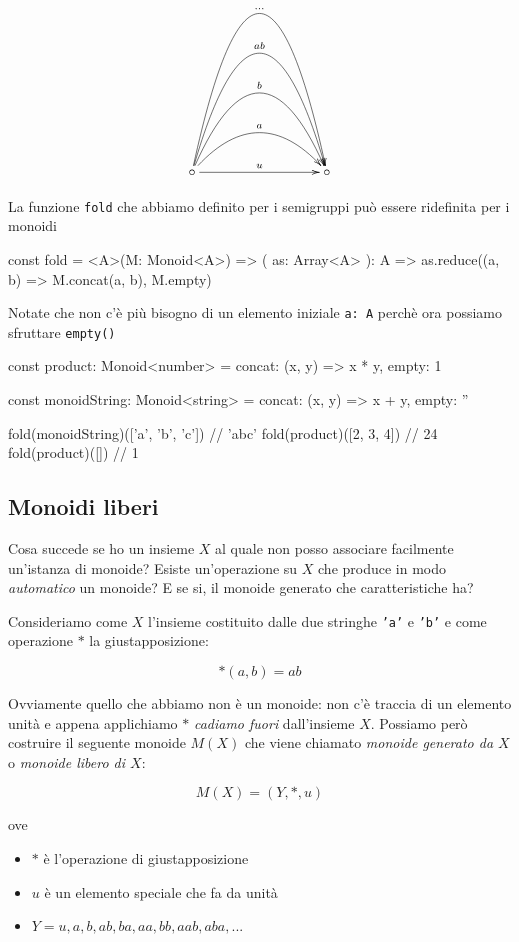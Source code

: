 \documentclass[12pt]{article}
\theoremstyle{definition}
\newenvironment{code}
  {\vspace{0.5cm} \VerbatimEnvironment\begin{typescriptcode}}
  {\end{typescriptcode} \vspace{0.2cm}}
\begin{document}
\[
\xymatrixrowsep{3cm}
\xymatrixcolsep{3cm}
\xymatrix{
  \circ \ar[r]^u \ar@/^1cm/[r]^a \ar@/^2cm/[r]^b \ar@/^3cm/[r]^{ab} \ar@/^4cm/[r]^{\ldots} & \circ
}
\]

La funzione \texttt{fold} che abbiamo definito per i semigruppi può essere ridefinita per i monoidi

\begin{code}
const fold = <A>(M: Monoid<A>) => (
  as: Array<A>
): A => as.reduce((a, b) => M.concat(a, b), M.empty)
\end{code}

Notate che non c'è più bisogno di un elemento iniziale \texttt{a: A} perchè ora possiamo sfruttare \texttt{empty()}

\begin{code}
const product: Monoid<number> = {
  concat: (x, y) => x * y,
  empty: 1
}

const monoidString: Monoid<string> = {
  concat: (x, y) => x + y,
  empty: ''
}

fold(monoidString)(['a', 'b', 'c']) // 'abc'
fold(product)([2, 3, 4]) // 24
fold(product)([]) // 1
\end{code}

\subsection{Monoidi liberi}

Cosa succede se ho un insieme $X$ al quale non posso associare facilmente un'istanza di monoide?
Esiste un'operazione su $X$ che produce in modo \emph{automatico} un monoide?
E se si, il monoide generato che caratteristiche ha?

Consideriamo come $X$ l'insieme costituito dalle due stringhe \texttt{'a'} e \texttt{'b'} e come operazione $*$ la giustapposizione:

$$
*(a, b) = ab
$$

Ovviamente quello che abbiamo non è un monoide: non c'è traccia di un elemento unità e appena applichiamo $*$ \emph{cadiamo fuori}
dall'insieme $X$. Possiamo però costruire il seguente monoide $M(X)$ che viene chiamato \emph{monoide generato da $X$} o \emph{monoide libero di $X$}:

$$
M(X) = (Y, *, u)
$$

ove

\begin{itemize}
  \item $*$ è l'operazione di giustapposizione
  \item $u$ è un elemento speciale che fa da unità
  \item $Y = { u, a, b, ab, ba, aa, bb, aab, aba, ... }$
\end{itemize}
\end{document}
